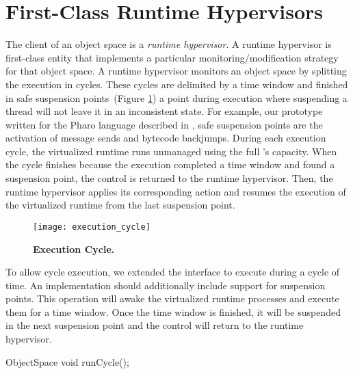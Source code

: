 
\section{First-Class Runtime Hypervisors}\label{sec:hypervisor}

The client of an object space is a \emph{runtime hypervisor}. A runtime hypervisor is first-class entity that implements a particular monitoring/modification strategy for that object space. A runtime hypervisor monitors an object space by splitting the execution in cycles. These cycles are delimited by a time window and finished in safe suspension points~(Figure \ref{fig:execution_cycle}) \ie a point during execution where suspending a thread will not leave it in an inconsistent state. For example, our \Vtt prototype written for the Pharo language described in , safe suspension points are the activation of message sends and bytecode backjumps. During each execution cycle, the virtualized runtime runs unmanaged using the full \VM's capacity. When the cycle finishes because the execution completed a time window and found a suspension point, the control is returned to the runtime hypervisor. Then, the runtime hypervisor applies its corresponding action and resumes the execution of the virtualized runtime from the last suspension point.

\begin{figure}[ht]
\center
\texttt{[image: execution\_cycle]}
\caption{\textbf{Execution Cycle.} \label{fig:execution_cycle}}
\end{figure}

To allow cycle execution, we extended the  interface to execute during a cycle of time. An \Vtt implementation should additionally include support for suspension points. This operation will awake the virtualized runtime processes and execute them for a time window. Once the time window is finished, it will be suspended in the next suspension point and the control will return to the runtime hypervisor.

\begin{code}
ObjectSpace {
    void runCycle();
}
\end{code}



